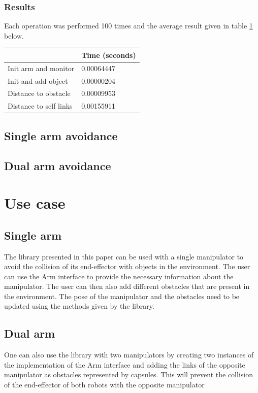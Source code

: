 \documentclass[a4paper, 10pt, conference]{ieeeconf}      %
\begin{document}
\subsubsection{Results}
Each operation was performed 100 times and the average result given in table \ref{table:Function Times} below.

\begin{table}[]
	\centering
	\begin{tabular}{|l|l|}
		\hline
		& Time (seconds) \\ \hline
		Init arm and monitor   & 0.00064447     \\ \hline
		Init and add object    & 0.00000204     \\ \hline
		Distance to obstacle   & 0.00009953     \\ \hline
		Distance to self links & 0.00155911     \\ \hline
	\end{tabular}
	\label{table:Function Times}
\end{table}




\subsection{Single arm avoidance} %

\subsection{Dual arm avoidance} %


\section{Use case}

\subsection{Single arm} %
The library presented in this paper can be used with a single manipulator to avoid the collision of its end-effector with objects in the environment.
The user can use the Arm interface to provide the necessary information about the manipulator.
The user can then also add different obstacles that are present in the environment.
The pose of the manipulator and the obstacles need to be updated using the methods given by the library.
\subsection{Dual arm} %
One can also use the library with two manipulators by creating two instances of the implementation of the Arm interface and adding the links of 
the opposite manipulator as obstacles represented by capsules.
This will prevent the collision of the end-effector of both robots with the opposite manipulator
\end{document}
